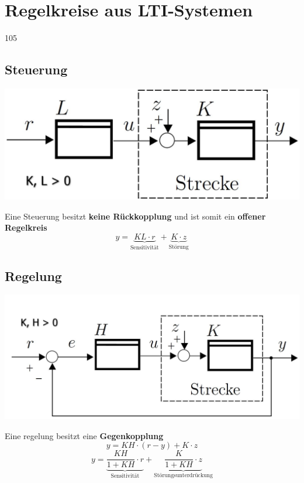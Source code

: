 \section{Regelkreise aus LTI-Systemen}{105}

\subsection{Steuerung} 
    
    \begin{minipage}[c]{0.48\columnwidth}
        \includegraphics[align=center, width=\columnwidth]{images/steuerung.jpg}
    \end{minipage}
    \hfill
    \begin{minipage}[c]{0.5\columnwidth}
        Eine Steuerung besitzt \textbf{keine Rückkopplung} und ist somit ein \textbf{offener Regelkreis}
        $$ y = \underbrace{K L \cdot r}_{\text{Sensitivität}} + \underbrace{K \cdot z}_{\text{Störung}}$$
    \end{minipage}


\subsection{Regelung}

    \begin{minipage}[c]{0.48\columnwidth}
        \includegraphics[align=center, width=\columnwidth]{images/regelung.jpg}
    \end{minipage}
    \hfill
    \begin{minipage}[c]{0.5\columnwidth}
        Eine regelung besitzt eine \textbf{Gegenkopplung}
        $$ y = K H \cdot (r - y) + K \cdot z$$
        $$ y = \underbrace{\frac{K H}{1 + K H} \cdot r}_{\text{Sensitivität}} + \underbrace{\frac{K}{1 + K H} \cdot z}_{\text{Störungsunterdrückung}} $$
    \end{minipage}


